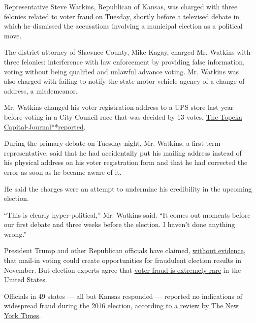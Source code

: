 Representative Steve Watkins, Republican of Kansas, was charged with
three felonies related to voter fraud on Tuesday, shortly before a
televised debate in which he dismissed the accusations involving a
municipal election as a political move.

The district attorney of Shawnee County, Mike Kagay, charged Mr. Watkins
with three felonies: interference with law enforcement by providing
false information, voting without being qualified and unlawful advance
voting. Mr. Watkins was also charged with failing to notify the state
motor vehicle agency of a change of address, a misdemeanor.

Mr. Watkins changed his voter registration address to a UPS store last
year before voting in a City Council race that was decided by 13 votes,
\href{https://www.cjonline.com/news/20191203/us-rep-steve-watkins-tangled-in-voter-fraud-perjury-allegations-for-listing-ups-store-as-residence}{The
Topeka
Capital-Journal}\href{https://www.cjonline.com/news/20191203/us-rep-steve-watkins-tangled-in-voter-fraud-perjury-allegations-for-listing-ups-store-as-residence}{**}\href{https://www.cjonline.com/news/20191203/us-rep-steve-watkins-tangled-in-voter-fraud-perjury-allegations-for-listing-ups-store-as-residence}{reported}.

During the primary debate on Tuesday night, Mr. Watkins, a first-term
representative, said that he had accidentally put his mailing address
instead of his physical address on his voter registration form and that
he had corrected the error as soon as he became aware of it.

He said the charges were an attempt to undermine his credibility in the
upcoming election.

``This is clearly hyper-political,'' Mr. Watkins said. ``It comes out
moments before our first debate and three weeks before the election. I
haven't done anything wrong.''

President Trump and other Republican officials have claimed,
\href{https://www.nytimes.com/article/mail-in-vote-fraud-ballot.html}{without
evidence}, that mail-in voting could create opportunities for fraudulent
election results in November. But election experts agree that
\href{https://scholars.org/sites/scholars/files/ssn_key_findings_minnite_on_the_myth_of_voter_fraud.pdf}{voter
fraud is extremely rare} in the United States.

Officials in 49 states --- all but Kansas responded --- reported no
indications of widespread fraud during the 2016 election,
\href{https://www.nytimes.com/2016/12/18/us/voter-fraud.html}{according
to a review by The New York Times}.

